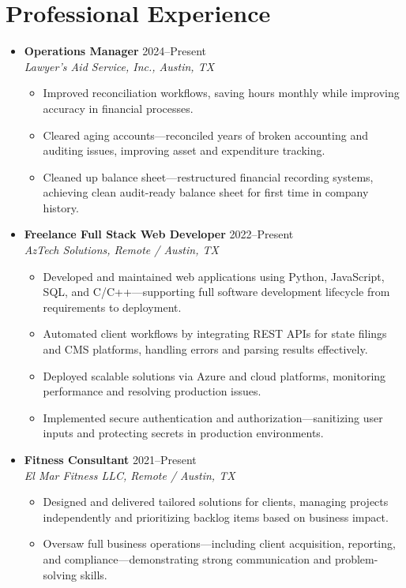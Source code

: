 \documentclass[letterpaper,10pt]{article}
\newcommand{\resumeItem}[1]{\item \small{#1}}
\begin{document}
\section*{Professional Experience}
\begin{itemize}
  \item[]
    \textbf{Operations Manager} \hfill 2024--Present \\
    \textit{Lawyer's Aid Service, Inc., Austin, TX}
  \begin{itemize}
    \resumeItem{Improved reconciliation workflows, saving hours monthly while improving accuracy in financial processes.}
    \resumeItem{Cleared aging accounts---reconciled years of broken accounting and auditing issues, improving asset and expenditure tracking.}
    \resumeItem{Cleaned up balance sheet---restructured financial recording systems, achieving clean audit-ready balance sheet for first time in company history.}
  \end{itemize}

  \item[]
    \textbf{Freelance Full Stack Web Developer} \hfill 2022--Present \\
    \textit{AzTech Solutions, Remote / Austin, TX}
  \begin{itemize}
    \resumeItem{Developed and maintained web applications using Python, JavaScript, SQL, and C/C++---supporting full software development lifecycle from requirements to deployment.}
    \resumeItem{Automated client workflows by integrating REST APIs for state filings and CMS platforms, handling errors and parsing results effectively.}
    \resumeItem{Deployed scalable solutions via Azure and cloud platforms, monitoring performance and resolving production issues.}
    \resumeItem{Implemented secure authentication and authorization---sanitizing user inputs and protecting secrets in production environments.}
  \end{itemize}

  \item[]
    \textbf{Fitness Consultant} \hfill 2021--Present \\
    \textit{El Mar Fitness LLC, Remote / Austin, TX}
  \begin{itemize}
    \resumeItem{Designed and delivered tailored solutions for clients, managing projects independently and prioritizing backlog items based on business impact.}
    \resumeItem{Oversaw full business operations---including client acquisition, reporting, and compliance---demonstrating strong communication and problem-solving skills.}
  \end{itemize}
\end{itemize}
\end{document}
